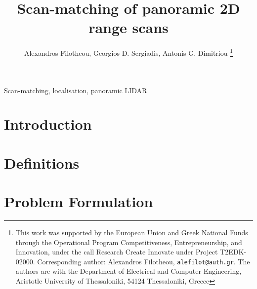\documentclass[letterpaper, 10 pt, conference]{ieeeconf}
\begin{document}
\title{\LARGE \bf Scan-matching of panoramic 2D range scans}


\author{Alexandros Filotheou, Georgios D. Sergiadis, Antonis G. Dimitriou%
  \thanks{This work was supported by the European Union and Greek National Funds
  through the Operational Program Competitiveness, Entrepreneurship, and
  Innovation, under the call Research Create Innovate under Project T2EDK-02000.
  Corresponding author: Alexandros Filotheou, {\tt\small alefilot@auth.gr}.
  The authors are with the Department of Electrical and Computer Engineering,
  Aristotle University of Thessaloniki, 54124 Thessaloniki, Greece}
}

\maketitle
\thispagestyle{empty}
\pagestyle{empty}


\begin{abstract}
  
\end{abstract}

\begin{keywords}
Scan-matching, localisation, panoramic LIDAR
\end{keywords}

\section{Introduction}
  

\section{Definitions}
  \label{section:definitions}
  

\section{Problem Formulation}
  \label{section:the_problem}
  

\end{document}
